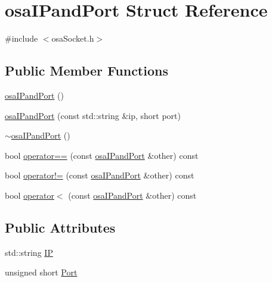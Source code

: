 \hypertarget{structosa_i_pand_port}{\section{osa\-I\-Pand\-Port Struct Reference}
\label{structosa_i_pand_port}
}


{\ttfamily \#include $<$osa\-Socket.\-h$>$}

\subsection*{Public Member Functions}
\begin{DoxyCompactItemize}
\item 
\hyperlink{structosa_i_pand_port_a5f824e2392908653bc45229f420c968b}{osa\-I\-Pand\-Port} ()
\item 
\hyperlink{structosa_i_pand_port_a9e4bc64f6b38fcaa135d9627970bef5c}{osa\-I\-Pand\-Port} (const std\-::string \&ip, short port)
\item 
\hyperlink{structosa_i_pand_port_ac922cdf0b1b42a6930482674a85505e3}{$\sim$osa\-I\-Pand\-Port} ()
\item 
bool \hyperlink{structosa_i_pand_port_a54dc51a33e3cf39b146ee1a7e65f74fa}{operator==} (const \hyperlink{structosa_i_pand_port}{osa\-I\-Pand\-Port} \&other) const 
\item 
bool \hyperlink{structosa_i_pand_port_a5a42cd75d716c41e26deb9be8f2e5708}{operator!=} (const \hyperlink{structosa_i_pand_port}{osa\-I\-Pand\-Port} \&other) const 
\item 
bool \hyperlink{structosa_i_pand_port_aabc2dcbeb95213d43105a4eea91537ab}{operator$<$} (const \hyperlink{structosa_i_pand_port}{osa\-I\-Pand\-Port} \&other) const 
\end{DoxyCompactItemize}
\subsection*{Public Attributes}
\begin{DoxyCompactItemize}
\item 
std\-::string \hyperlink{structosa_i_pand_port_aae6975367437b9d6f2f031696e9d84aa}{I\-P}
\item 
unsigned short \hyperlink{structosa_i_pand_port_af453d309ea5394037e662725ac6dee10}{Port}
\end{DoxyCompactItemize}


